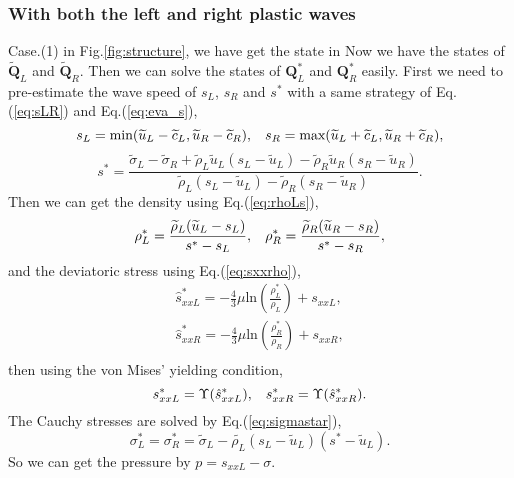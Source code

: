 \documentclass{article}
\theoremstyle{plain}\newtheorem{definition}{\sc{Definition}}
\theoremstyle{defination}\newtheorem{example}{Example}[section]
\numberwithin{equation}{section}
\numberwithin{table}{section}
\begin{document}
\subsubsection{With both the left and right plastic waves}
Case.(1) in Fig.\ref{fig:structure}, we have get the state in 
Now we have the states of $\widetilde{\bm{Q}}_L$ and  $\widetilde{\bm{Q}}_R$. Then we can solve the states of   $\bm{Q}_L^*$ and $\bm{Q}_R^*$ easily. 
First we need to pre-estimate the wave speed of $s_L$, $s_R$ and $s^*$ with a same strategy of Eq.(\ref{eq:sLR}) and Eq.(\ref{eq:eva_s}),
\begin{equation}
  s_L = \text{min} (\widetilde{u}_L-\widetilde{c}_L, \widetilde{u}_R-\widetilde{c}_R), \hspace{0.3cm} s_R = \text{max}(\widetilde{u}_L+\widetilde{c}_L, \widetilde{u}_R+\widetilde{c}_R),
	\end{equation}
	\begin{equation}
	  s^* = \frac{\widetilde{\sigma}_L-\widetilde{\sigma}_R+\widetilde{\rho}_L \widetilde{u}_L(s_L-\widetilde{u}_L)-\widetilde{\rho}_R \widetilde{u}_R(s_R-\widetilde{u}_R)}{\widetilde{\rho}_L(s_L-\widetilde{u}_L)-\widetilde{\rho}_R(s_R-\widetilde{u}_R)}.
\end{equation}
Then we can get the density using Eq.(\ref{eq:rhoLs}),
\begin{equation}
  \rho_L^* = \frac{\widetilde{\rho}_L(\widetilde{u}_L-s_L)}{s^*-s_L}, \hspace{0.3cm}  \rho_R^* = \frac{\widetilde{\rho}_R(\widetilde{u}_R-s_R)}{s^*-s_R},
\end{equation}
and the deviatoric stress using Eq.(\ref{eq:sxxrho}),
  \begin{align}
  \hat{s}_{xxL}^* =  -\frac{4}{3}\mu \text{ln}\left( \frac{\rho_L^*}{\rho_L}  \right)+s_{xxL},\\
  \hat{s}_{xxR}^* =  -\frac{4}{3}\mu \text{ln}\left( \frac{\rho_R^*}{\rho_R}  \right)+s_{xxR},\\
\end{align}
then using  the von Mises' yielding condition,
\begin{equation}
  s_{xxL}^* = \Upsilon(\hat{s}_{xxL}^*) , \hspace{0.3cm}  s_{xxR}^* = \Upsilon(\hat{s}_{xxR}^*).
\end{equation}
The Cauchy stresses  are solved by Eq.(\ref{eq:sigmastar}),
\begin{equation}
  \sigma_L^*=\sigma_R^*=\widetilde{\sigma}_L -\widetilde{\rho_L} (s_L-\widetilde{u}_L)(s^*-\widetilde{u}_L).
\end{equation}
So we can get the pressure by $p =s_{xxL}-\sigma$.
\end{document}
